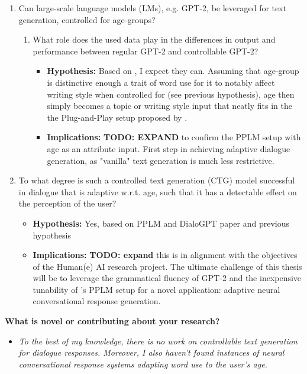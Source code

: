 \begin{enumerate}
    \item Can large-scale language models (LMs), e.g. GPT-2, be leveraged for text generation, controlled for age-groups?
    \begin{enumerate}
        \item What role does the used data play in the differences in output and performance between regular GPT-2 and controllable GPT-2?
        \begin{itemize}
            \item \textbf{Hypothesis:} Based on \cite{dathathri2019plug, pennebaker2003words}, I expect they can. Assuming that age-group is distinctive enough a trait of word use for it to notably affect writing style when controlled for (see previous hypothesis), age then simply becomes a topic or writing style input that neatly fits in the the Plug-and-Play setup proposed by \citeauthor{dathathri2019plug}. 
            \item \textbf{Implications:} \textbf{TODO: EXPAND} to confirm the PPLM setup with age as an attribute input. First step in achieving adaptive dialogue generation, as "vanilla" text generation is much less restrictive.
        \end{itemize}
    \end{enumerate}
    \item To what degree is such a controlled text generation (CTG) model successful in dialogue that is adaptive w.r.t. age, such that it has a detectable effect on the perception of the user?
    \begin{itemize}
        \item \textbf{Hypothesis:} Yes, based on PPLM and DialoGPT paper and previous hypothesis
        \item \textbf{Implications:} \textbf{TODO: expand} this is in alignment with the objectives of the Human(e) AI research project. The ultimate challenge of this thesis will be to leverage the grammatical fluency of GPT-2 and the inexpensive tunability of \citeauthor{dathathri2019plug}'s PPLM setup for a novel application: adaptive neural conversational response generation.
    \end{itemize}
\end{enumerate}

\textbf{What is novel or contributing about your research?}
\begin{itemize}
    \item \textit{To the best of my knowledge, there is no work on controllable text generation for dialogue responses. Moreover, I also haven't found instances of neural conversational response systems adapting word use to the user's age.}
\end{itemize}

